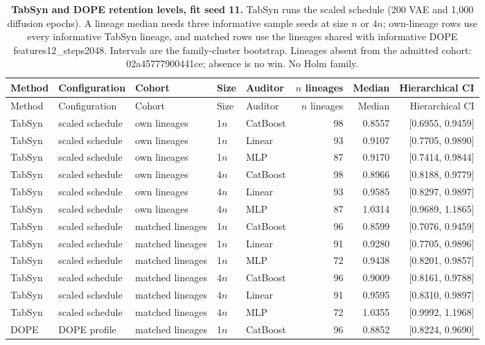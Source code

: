 \begin{longtable}{lllllrrr}
\caption{\textbf{TabSyn and DOPE retention levels, fit seed 11.} TabSyn runs the scaled schedule (200 VAE and 1{,}000 diffusion epochs). A lineage median needs three informative sample seeds at size $n$ or $4n$; own-lineage rows use every informative TabSyn lineage, and matched rows use the lineages shared with informative DOPE features12\_\allowbreak steps2048. Intervals are the family-cluster bootstrap. Lineages absent from the admitted cohort: 02a45777900441ce; absence is no win. No Holm family.}\label{tab:review-tabsyn}\\
\toprule
Method & Configuration & Cohort & Size & Auditor & $n$ lineages & Median & Hierarchical CI \\
\midrule
\endfirsthead
\toprule
Method & Configuration & Cohort & Size & Auditor & $n$ lineages & Median & Hierarchical CI \\
\midrule
\endhead
TabSyn & scaled schedule & own lineages & 1$n$ & CatBoost & 98 & 0.8557 & [0.6955, 0.9459] \\
TabSyn & scaled schedule & own lineages & 1$n$ & Linear & 93 & 0.9107 & [0.7705, 0.9890] \\
TabSyn & scaled schedule & own lineages & 1$n$ & MLP & 87 & 0.9170 & [0.7414, 0.9844] \\
TabSyn & scaled schedule & own lineages & 4$n$ & CatBoost & 98 & 0.8966 & [0.8188, 0.9779] \\
TabSyn & scaled schedule & own lineages & 4$n$ & Linear & 93 & 0.9585 & [0.8297, 0.9897] \\
TabSyn & scaled schedule & own lineages & 4$n$ & MLP & 87 & 1.0314 & [0.9689, 1.1865] \\
TabSyn & scaled schedule & matched lineages & 1$n$ & CatBoost & 96 & 0.8599 & [0.7076, 0.9459] \\
TabSyn & scaled schedule & matched lineages & 1$n$ & Linear & 91 & 0.9280 & [0.7705, 0.9896] \\
TabSyn & scaled schedule & matched lineages & 1$n$ & MLP & 72 & 0.9438 & [0.8201, 0.9857] \\
TabSyn & scaled schedule & matched lineages & 4$n$ & CatBoost & 96 & 0.9009 & [0.8161, 0.9788] \\
TabSyn & scaled schedule & matched lineages & 4$n$ & Linear & 91 & 0.9595 & [0.8310, 0.9897] \\
TabSyn & scaled schedule & matched lineages & 4$n$ & MLP & 72 & 1.0355 & [0.9992, 1.1968] \\
DOPE & DOPE profile & matched lineages & 1$n$ & CatBoost & 96 & 0.8852 & [0.8224, 0.9690] \\

\end{longtable}
